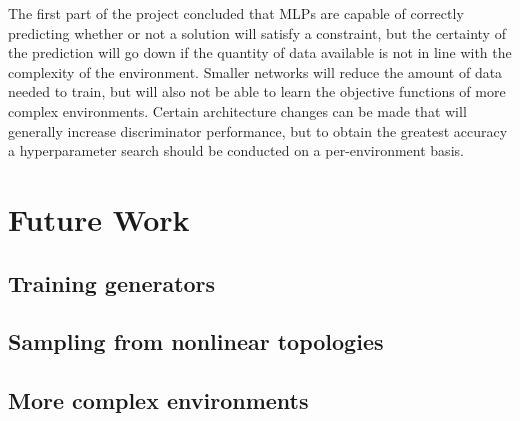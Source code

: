 \documentclass[a4paper]{article}
\begin{document}
The first part of the project concluded that MLPs are capable of correctly predicting whether or not a solution will satisfy a constraint,
but the certainty of the prediction will go down if the quantity of data available is not in line with the complexity of the environment.
Smaller networks will reduce the amount of data needed to train, but will also not be able to learn the objective functions of more complex environments.
Certain architecture changes can be made that will generally increase discriminator performance,
but to obtain the greatest accuracy a hyperparameter search should be conducted on a per-environment basis.

\section{Future Work}

\subsection{Training generators}

\subsection{Sampling from nonlinear topologies}

\subsection{More complex environments}
\end{document}
